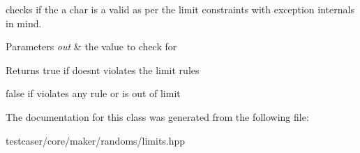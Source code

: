 checks if the a char is a valid as per the limit constraints with exception internals in mind. 


\begin{DoxyParams}{Parameters}
{\em out} & the value to check for \\
\hline
\end{DoxyParams}
\begin{DoxyReturn}{Returns}
true if doesn\textquotesingle{}t violates the limit rules 

false if violates any rule or is out of limit 
\end{DoxyReturn}


The documentation for this class was generated from the following file\+:\begin{DoxyCompactItemize}
\item 
testcaser/core/maker/randoms/limits.\+hpp\end{DoxyCompactItemize}
